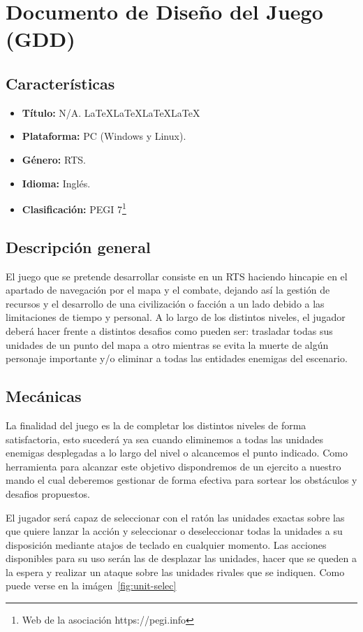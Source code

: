 \chapter{Documento de Diseño del Juego (GDD)}
\section{Características}
\begin{itemize}
	\item \textbf{Título:} N/A. \LaTeX \LaTeX \LaTeX \LaTeX
	\item \textbf{Plataforma:} \ac{PC} (Windows y Linux).
	\item \textbf{Género:} \acf{RTS}.
	\item \textbf{Idioma:} Inglés.
	\item \textbf{Clasificación:} PEGI 7\footnote{Web de la asociación https://pegi.info}
\end{itemize}

\section{Descripción general}
El juego que se pretende desarrollar consiste en un \ac{RTS} haciendo hincapie en el
apartado de navegación por el mapa y el combate, dejando así la gestión de recursos
y el desarrollo de una civilización o facción a un lado debido a las limitaciones
de tiempo y personal. A lo largo de los distintos niveles, el jugador deberá hacer
frente a distintos desafios como pueden ser: trasladar todas sus unidades de un punto
del mapa a otro mientras se evita la muerte de algún personaje importante y/o eliminar
a todas las entidades enemigas del escenario.

\section{Mecánicas}
La finalidad del juego es la de completar los distintos niveles de forma satisfactoria,
esto sucederá ya sea cuando eliminemos a todas las unidades enemigas desplegadas a lo
largo del nivel o alcancemos el punto indicado. Como herramienta para alcanzar este
objetivo dispondremos de un ejercito a nuestro mando el cual deberemos gestionar de
forma efectiva para sortear los obstáculos y desafios propuestos.

El jugador será capaz de seleccionar con el ratón las unidades exactas sobre las que
quiere lanzar la acción y seleccionar o deseleccionar todas la unidades a su
disposición mediante atajos de teclado en cualquier momento. Las acciones disponibles
para su uso serán las de desplazar las unidades, hacer que se queden a la espera y
realizar un ataque sobre las unidades rivales que se indiquen. Como puede verse en la
imágen~\ref{fig:unit-selec}

